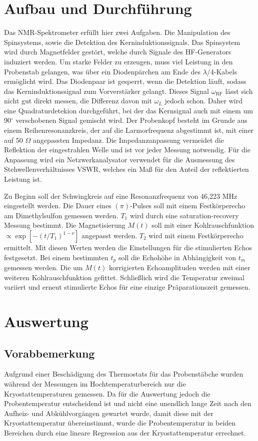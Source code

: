 \section{Aufbau und Durchführung}
Das NMR-Spektrometer erfüllt hier zwei Aufgaben. Die Manipulation des Spinsystems, sowie die Detektion des Kerninduktionssignals. Das Spinsystem wird durch
Magnetfelder gestört, welche durch Signale des HF-Generators induziert werden. Um starke Felder zu erzeugen, muss viel Leistung in den Probenstab gelangen,
was über ein Diodenpärchen am Ende des $\lambda$/4-Kabels ermöglicht wird. Das Diodenpaar ist gesperrt, wenn die Detektion läuft, sodass das Kerninduktionssignal
zum Vorverstärker gelangt. Dieses Signal $\omega_\text{RF}$ lässt sich nicht gut direkt messen, die Differenz davon mit $\omega_L$ jedoch schon. Daher wird
eine Quadraturdetekion durchgeführt, bei der das Kernsignal auch mit einem um 90$^\circ$ verschobenen Signal gemischt wird. Der Probenkopf besteht im Grunde
aus einem Reihenresonanzkreis, der auf die Larmorfrequenz abgestimmt ist, mit einer auf 50 $\Omega$ angepassten Impedanz. Die Impedanzanpassung vermeidet die 
Reflektion der eingestrahlen Welle und ist vor jeder Messung notwendig. Für die Anpassung wird ein Netzwerkanalysator verwendet für die Ausmessung des
Stehwellenverhältnisses VSWR, welches ein Maß für den Anteil der reflektierten Leistung ist.

\noindent Zu Beginn soll der Schwingkreis auf eine Resonanzfrequenz von 46,223 MHz eingestellt werden. Die Dauer eines $(\pi)$-Pulses soll mit einem 
Festkörperecho am Dimethylsulfon gemessen werden. $T_1$ wird durch eine saturation-recovery Messung bestimmt. Die Magnetisierung $M(t)$ soll mit einer
Kohlrauschfunktion $\propto \exp[-(t/T_1)^{1-\nu}]$ angepasst werden. $T_2$ wird mit einem Festkörperecho ermittelt. Mit diesen Werten werden die Einstellungen
für die stimulierten Echos festgesetzt. Bei einem bestimmten $t_p$ soll die Echohöhe in Abhängigkeit von $t_m$ gemessen werden. Die um $M(t)$ korrigierten
Echoamplituden werden mit einer weiteren Kohlrauschfunktion gefittet. Schließlich wird die Temperatur zweimal variiert und erneut stimulierte Echos für eine einzige
Präparationszeit gemessen.

\section{Auswertung}
\subsection{Vorabbemerkung}
Aufgrund einer Beschädigung des Thermostats für das Probenstäbche wurden während der Messungen im Hochtemperaturbereich nur die Kryostattemperaturen gemessen. Da für die Auswertung jedoch die Probentemperatur entscheidend ist und nicht eine unendlich lange Zeit nach den Aufheiz- und Abkühlvorgängen gewartet wurde, damit diese mit der  Kryostattemperatur übereinstimmt, wurde die Probentemperatur in beiden Bereichen durch eine lineare Regression aus der Kryostattemperatur errechnet.
